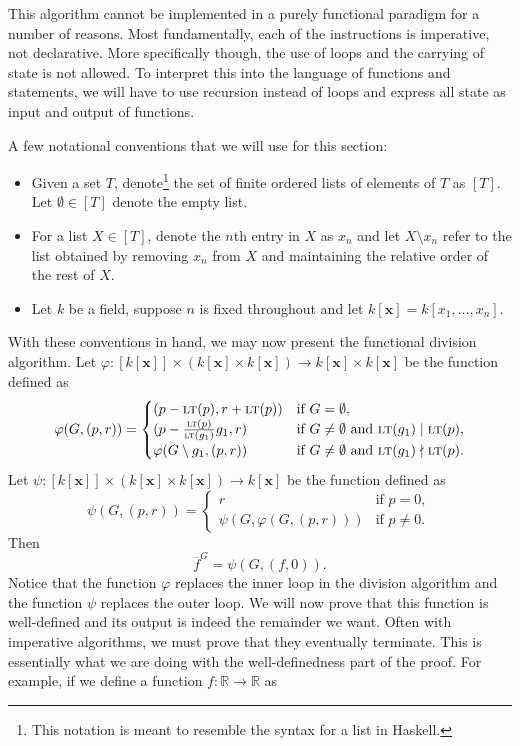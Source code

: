 \documentclass[MS, xcolor=dvipsnames]{wfuthesis}
\def\bR{\mathbb{R}}
\newcommand{\LT}{\ensuremath{\text{\sc lt}}}
\def\and{\text{ and }}
\theoremstyle{definition}
\def\p{\varphi}
\begin{document}
This algorithm cannot be implemented in a purely functional paradigm for a number of reasons. Most fundamentally, each of the instructions is imperative, not declarative. More specifically though, the use of loops and the carrying of state is not allowed. To interpret this into the language of functions and statements, we will have to use recursion instead of loops and express all state as input and output of functions. \par
A few notational conventions that we will use for this section:
\begin{itemize}
  \item Given a set $T$, denote\footnote{This notation is meant to resemble the syntax for a list in Haskell.} the set of finite ordered lists of elements of $T$ as $[T]$. Let $\emptyset \in [T]$ denote the empty list.
  \item For a list $X \in [T]$, denote the $n$th entry in $X$ as $x_n$ and let $X \setminus x_n$ refer to the list obtained by removing $x_n$ from $X$ and maintaining the relative order of the rest of $X$.
  \item Let $k$ be a field, suppose $n$ is fixed throughout and let $k[\mathbf x] = k[x_1,\dots,x_n]$.
\end{itemize}
With these conventions in hand, we may now present the functional division algorithm. Let $\p: [k[\mathbf x]] \times \left( k[\mathbf x] \times k[\mathbf x] \right) \to k[\mathbf x] \times k[\mathbf x]$ be the function defined as
\[ \p(G,(p,r)) = \begin{cases} (p-\LT(p),r+\LT(p)) &\text{if } G = \emptyset, \\ (p-\frac{\LT(p)}{\LT(g_1)}g_1,r) &\text{if } G \ne \emptyset \and \LT(g_1) \mid \LT(p), \\ \p(G\setminus g_1,(p,r)) &\text{if } G \ne \emptyset \and \LT(g_1) \nmid \LT(p). \end{cases} \]
Let $\psi: [k[\mathbf x]] \times \left( k[\mathbf x] \times k[\mathbf x] \right) \to k[\mathbf x]$ be the function defined as
\[ \psi(G,(p,r)) = \begin{cases} r &\text{if } p = 0, \\ \psi(G,\p(G,(p,r))) &\text{if } p \ne 0. \end{cases} \]
Then
\[ \overline f^{G} = \psi(G,(f,0)). \]
Notice that the function $\p$ replaces the inner loop in the division algorithm and the function $\psi$ replaces the outer loop. We will now prove that this function is well-defined and its output is indeed the remainder we want. Often with imperative algorithms, we must prove that they eventually terminate. This is essentially what we are doing with the well-definedness part of the proof. For example, if we define a function $f: \bR \to \bR$ as
\end{document}
